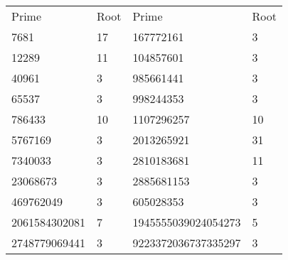 \begin{tabular}{ l l l l }
    Prime & Root & Prime & Root \\
    7681  &   17 & 167772161 & 3 \\
    12289 & 11 & 104857601 & 3 \\
    40961 & 3 & 985661441 & 3 \\
    65537 & 3 & 998244353 & 3 \\   
    786433 & 10 & 1107296257 & 10 \\
    5767169 & 3 & 2013265921 & 31 \\
    7340033 & 3 & 2810183681 & 11 \\
    23068673 & 3 & 2885681153 & 3 \\
    469762049 & 3 & 605028353 & 3 \\
    2061584302081 & 7 & 1945555039024054273 & 5 \\
    2748779069441 & 3 & 9223372036737335297 & 3
\end{tabular}
